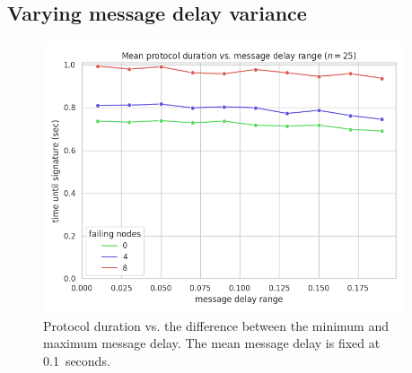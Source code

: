 \subsection*{Varying message delay variance}

\begin{figure}[H]
    \centering
    \includegraphics[width=0.95\textwidth]{figures/10/round_wall_sum_by_delay_range.png}
    \captionsetup{labelformat=empty}
    \caption{Protocol duration vs. the difference between the minimum and maximum message delay. The mean message delay is fixed at 0.1~seconds.}
\end{figure}

